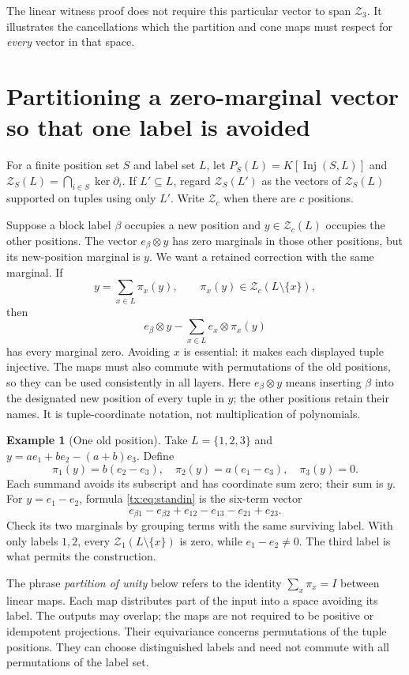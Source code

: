 \documentclass[11pt,a4paper,oneside,openany]{book}
\theoremstyle{definition}\newtheorem{definition}[theorem]{Definition}
\newtheorem{example}[theorem]{Example}
\theoremstyle{remark}\newtheorem{remark}[theorem]{Remark}
\DeclareMathOperator{\Inj}{Inj}
\numberwithin{equation}{chapter}
\begin{document}
The linear witness proof does not require this particular vector to
span $\mathcal Z_3$. It illustrates the cancellations which the
partition and cone maps must respect for \emph{every} vector in
that space.

\section{Partitioning a zero-marginal vector so that one label is avoided}\label{tx:sec:partition}
For a finite position set $S$ and label set $L$, let $P_S(L)=K[\Inj(S,L)]$ and $\mathcal Z_S(L)=\bigcap_{i\in S}\ker\partial_i$. If $L'\subseteq L$, regard $\mathcal Z_S(L')$ as the vectors of $\mathcal Z_S(L)$ supported on tuples using only $L'$. Write $\mathcal Z_c$ when there are $c$ positions.

Suppose a block label $\beta$ occupies a new position and $y\in \mathcal Z_c(L)$ occupies the other positions. The vector $e_\beta\otimes y$ has zero marginals in those other positions, but its new-position marginal is $y$. We want a retained correction with the same marginal. If
\[y=\sum_{x\in L}\pi_x(y),\qquad \pi_x(y)\in \mathcal Z_c(L\setminus\{x\}),
\]
then
\begin{equation}\label{tx:eq:standin}
e_\beta\otimes y-\sum_{x\in L}e_x\otimes\pi_x(y)
\end{equation}
has every marginal zero. Avoiding $x$ is essential: it makes each displayed tuple injective. The maps must also commute with permutations of the old positions, so they can be used consistently in all layers.
Here $e_\beta\otimes y$ means inserting $\beta$ into the designated
new position of every tuple in $y$; the other positions retain their
names. It is tuple-coordinate notation, not multiplication of
polynomials.

\begin{example}[One old position]
Take $L=\{1,2,3\}$ and $y=a e_1+b e_2-(a+b)e_3$. Define
\[\pi_1(y)=b(e_2-e_3),\quad \pi_2(y)=a(e_1-e_3),\quad\pi_3(y)=0.
\]
Each summand avoids its subscript and has coordinate sum zero; their sum is $y$. For $y=e_1-e_2$, formula \eqref{tx:eq:standin} is the six-term vector
\[e_{\beta1}-e_{\beta2}+e_{12}-e_{13}-e_{21}+e_{23}.
\]
Check its two marginals by grouping terms with the same surviving label. With only labels $1,2$, every $\mathcal Z_1(L\setminus\{x\})$ is zero, while $e_1-e_2\ne0$. The third label is what permits the construction.
\end{example}

The phrase \emph{partition of unity} below refers to the identity
$\sum_x\pi_x=I$ between linear maps. Each map distributes part of
the input into a space avoiding its label. The outputs may overlap;
the maps are not required to be positive or idempotent projections.
Their equivariance concerns permutations of the tuple positions.
They can choose distinguished labels and need not commute with all
permutations of the label set.
\end{document}
